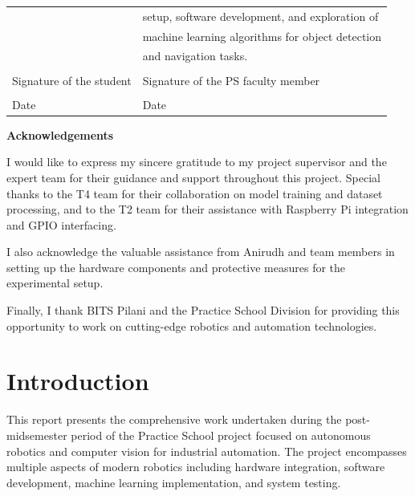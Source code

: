 \documentclass{book}
\begin{document}
{\begin{tabular}{p{6cm}l}
			& setup, software development, and exploration of \\
			& machine learning algorithms for object detection \\
			& and navigation tasks. \\
			& \\
			Signature of the student & \hspace*{1cm}Signature of the PS faculty member \\
			& \\
			Date & \hspace*{1cm}Date \\
		\end{tabular}}

	\newpage
	\centerline{\bf \Large Acknowledgements}
	\vspace*{0.5cm}
		\par\noindent I would like to express my sincere gratitude to my project supervisor and the expert team for their guidance and support throughout this project. Special thanks to the T4 team for their collaboration on model training and dataset processing, and to the T2 team for their assistance with Raspberry Pi integration and GPIO interfacing.
		
		\par\noindent I also acknowledge the valuable assistance from Anirudh and team members in setting up the hardware components and protective measures for the experimental setup.
		
		\par\noindent Finally, I thank BITS Pilani and the Practice School Division for providing this opportunity to work on cutting-edge robotics and automation technologies.
		\vfill

		\par{}

\tableofcontents
\listoffigures
\listoftables

\chapter{Introduction}

\par\noindent This report presents the comprehensive work undertaken during the post-midsemester period of the Practice School project focused on autonomous robotics and computer vision for industrial automation. The project encompasses multiple aspects of modern robotics including hardware integration, software development, machine learning implementation, and system testing.
\end{document}
